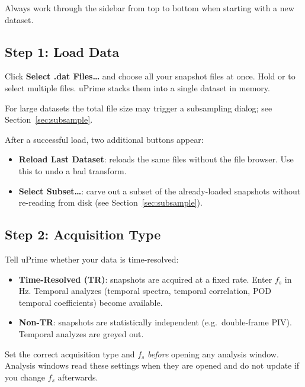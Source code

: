 \documentclass[11pt, a4paper]{report}
\newcommand{\uipth}[1]{\textbf{\textcolor{upblue}{#1}}}
\newcommand{\key}[1]{\fbox{\small\texttt{#1}}}
\begin{document}
Always work through the sidebar from top to bottom when starting with a new dataset.

\subsection{Step 1: Load Data}

Click \uipth{Select .dat Files\ldots} and choose all your snapshot files at once. Hold \key{Ctrl} or \key{Shift} to select multiple files. uPrime stacks them into a single dataset in memory.

For large datasets the total file size may trigger a subsampling dialog; see Section~\ref{sec:subsample}.

After a successful load, two additional buttons appear:

\begin{itemize}[leftmargin=1.5em]
  \item \uipth{Reload Last Dataset}: reloads the same files without the file browser. Use this to undo a bad transform.
  \item \uipth{Select Subset\ldots}: carve out a subset of the already-loaded snapshots without re-reading from disk (see Section~\ref{sec:subsample}).
\end{itemize}

\subsection{Step 2: Acquisition Type}

Tell uPrime whether your data is time-resolved:

\begin{itemize}[leftmargin=1.5em]
  \item \uipth{Time-Resolved (TR)}: snapshots are acquired at a fixed rate. Enter $f_s$ in Hz. Temporal analyzes (temporal spectra, temporal correlation, POD temporal coefficients) become available.
  \item \uipth{Non-TR}: snapshots are statistically independent (e.g.\ double-frame PIV). Temporal analyzes are greyed out.
\end{itemize}

\begin{warnbox}
Set the correct acquisition type and $f_s$ \emph{before} opening any analysis window. Analysis windows read these settings when they are opened and do not update if you change $f_s$ afterwards.
\end{warnbox}
\end{document}

